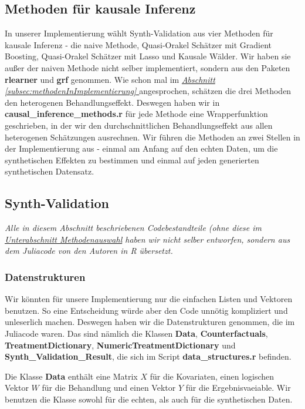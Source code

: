 \documentclass[12pt,a4paper,twoside]{scrartcl}
\numberwithin{equation}{section}
\newcommand{\refsec}[1]{\emph{\hyperref[#1]{Abschnitt \ref*{#1} }}}
\begin{document}
  	\subsection{Methoden für kausale Inferenz}\label{subsec:methodenKausaleInferenz}
  	In unserer Implementierung wählt  Synth-Validation aus vier Methoden für kausale Inferenz - die naive Methode, Quasi-Orakel Schätzer mit Gradient Boosting, Quasi-Orakel Schätzer mit Lasso und Kausale Wälder. Wir haben sie außer der naiven Methode nicht selber implementiert, sondern aus den Paketen \textbf{rlearner} und  \textbf{grf} genommen. Wie schon mal im \refsec{subsec:methodenInImplementierung} angesprochen, schätzen die drei Methoden den heterogenen Behandlungseffekt. Deswegen haben wir in \textbf{causal\_inference\_methods.r} für jede Methode eine Wrapperfunktion geschrieben, in der wir den durchschnittlichen Behandlungseffekt aus allen heterogenen Schätzungen ausrechnen. Wir führen die Methoden an zwei Stellen in der Implementierung aus - einmal am Anfang auf den echten Daten, um die synthetischen Effekten zu bestimmen und einmal auf jeden generierten synthetischen Datensatz. \par
\subsection{Synth-Validation}\label{subsec:synthValidation}
\noindent
\emph{Alle in diesem Abschnitt beschriebenen Codebestandteile (ohne diese im  \emph{\hyperref[subsubsec:methodenauswahl]{Unterabschnitt Methodenauswahl}} haben wir nicht selber entworfen, sondern aus dem Juliacode von den Autoren in R übersetzt.} \par
\subsubsection{Datenstrukturen}\label{subsubsec:datenstrukturen}

Wir könnten für unsere Implementierung nur die einfachen Listen und Vektoren benutzen. So eine Entscheidung würde aber den Code unnötig kompliziert und unleserlich machen. Deswegen haben wir die Datenstrukturen genommen, die im Juliacode waren. Das sind nämlich die Klassen \textbf{Data}, \textbf{Counterfactuals}, \textbf{TreatmentDictionary}, \textbf{NumericTreatmentDictionary} und \textbf{Synth\_Validation\_Result}, die sich im Script \textbf{data\_structures.r} befinden.\par 

\noindent
Die Klasse \textbf{Data} enthält  eine Matrix $X$ für die Kovariaten, einen logischen Vektor $W$ für die Behandlung und einen Vektor $Y$ für die Ergebnisvaeiable. Wir benutzen die Klasse sowohl für die echten, als auch für die synthetischen Daten.\par 
\end{document}
